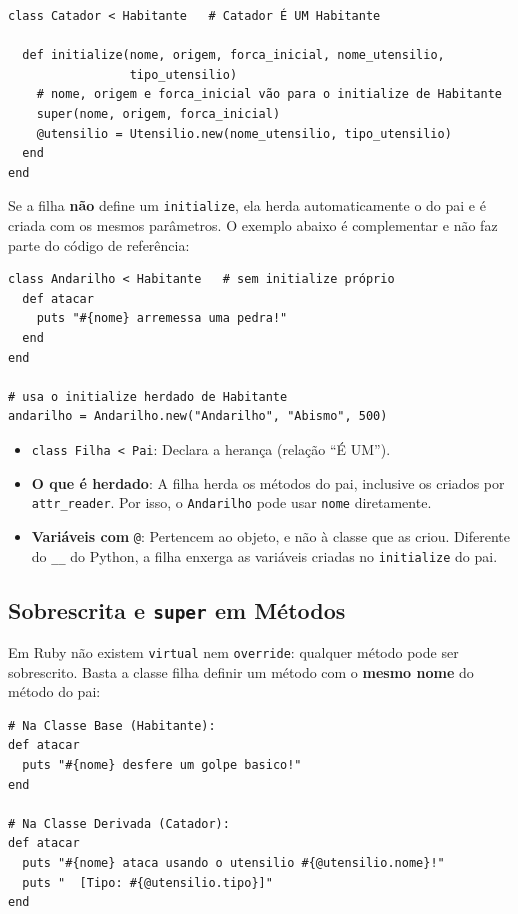 \begin{lstlisting}[style=ruby]
class Catador < Habitante   # Catador É UM Habitante

  def initialize(nome, origem, forca_inicial, nome_utensilio,
                 tipo_utensilio)
    # nome, origem e forca_inicial vão para o initialize de Habitante
    super(nome, origem, forca_inicial)
    @utensilio = Utensilio.new(nome_utensilio, tipo_utensilio)
  end
end
\end{lstlisting}

Se a filha \textbf{não} define um \texttt{initialize}, ela herda automaticamente o do pai e é
criada com os mesmos parâmetros. O exemplo abaixo é complementar e não faz parte do código de
referência:

\begin{lstlisting}[style=ruby]
class Andarilho < Habitante   # sem initialize próprio
  def atacar
    puts "#{nome} arremessa uma pedra!"
  end
end

# usa o initialize herdado de Habitante
andarilho = Andarilho.new("Andarilho", "Abismo", 500)
\end{lstlisting}

\begin{itemize}
    \item \texttt{class Filha < Pai}: Declara a herança (relação ``É UM'').

    \item \textbf{O que é herdado}: A filha herda os métodos do pai, inclusive os criados por
    \texttt{attr\_reader}. Por isso, o \texttt{Andarilho} pode usar \texttt{nome} diretamente.

    \item \textbf{Variáveis com} \texttt{@}: Pertencem ao objeto, e não à classe que as criou.
    Diferente do \texttt{\_\_} do Python, a filha enxerga as variáveis criadas no
    \texttt{initialize} do pai.
\end{itemize}

\subsection{Sobrescrita e \texttt{super} em Métodos}

Em Ruby não existem \texttt{virtual} nem \texttt{override}: qualquer método pode ser
sobrescrito. Basta a classe filha definir um método com o \textbf{mesmo nome} do método do pai:

\begin{lstlisting}[style=ruby]
# Na Classe Base (Habitante):
def atacar
  puts "#{nome} desfere um golpe basico!"
end

# Na Classe Derivada (Catador):
def atacar
  puts "#{nome} ataca usando o utensilio #{@utensilio.nome}!"
  puts "  [Tipo: #{@utensilio.tipo}]"
end
\end{lstlisting}

